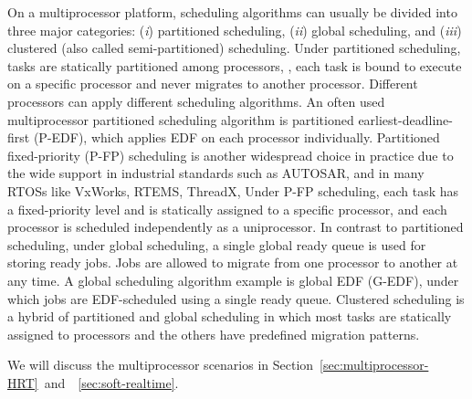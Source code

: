 
On a multiprocessor platform, scheduling algorithms can usually be divided into three major categories: (\textit{i}) partitioned scheduling, (\textit{ii}) global scheduling, and (\textit{iii}) clustered (also called semi-partitioned) scheduling. 
Under partitioned scheduling, tasks are statically partitioned among processors, \ie, each task is bound to execute on a specific processor and never migrates to another processor. Different processors can apply different scheduling algorithms. An often used multiprocessor partitioned scheduling algorithm is partitioned earliest-deadline-first (P-EDF), which applies EDF on each processor individually.
Partitioned fixed-priority (P-FP) scheduling is another widespread
choice in practice due to the wide support in industrial standards
such as AUTOSAR, and in many RTOSs like VxWorks, RTEMS, ThreadX, \etc
Under P-FP scheduling, each task has a fixed-priority level and is statically assigned to a specific processor, and each processor is scheduled independently as a uniprocessor.  
 In contrast to partitioned scheduling, under global scheduling, a single global ready queue is used for storing ready jobs.  Jobs are allowed to migrate from one processor to another at any time. A global scheduling algorithm example is global EDF (G-EDF), under which jobs are EDF-scheduled using a single ready queue.  
 Clustered scheduling is a hybrid of partitioned and global scheduling in which most tasks are statically assigned to processors and the others have predefined migration patterns. %

We will discuss the multiprocessor scenarios in Section~\ref{sec:multiprocessor-HRT}~and~\mysectionref{}~\ref{sec:soft-realtime}.



  
  
  
